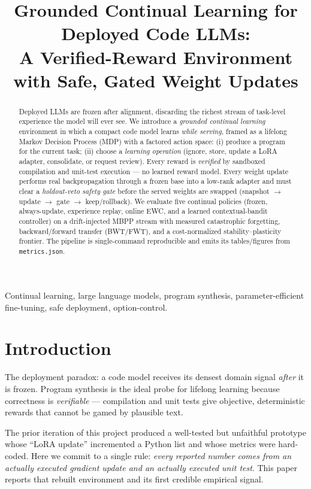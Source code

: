 \documentclass[10pt,conference]{IEEEtran}
\title{Grounded Continual Learning for Deployed Code LLMs:\\A Verified-Reward Environment with Safe, Gated Weight Updates}
\author{\IEEEauthorblockN{OpenContinualEnv Research}
\IEEEauthorblockA{Corresponding repository: \texttt{open\_continual\_env} (module \texttt{gcl})}
}
\begin{document}
\maketitle

\begin{abstract}
Deployed LLMs are frozen after alignment, discarding the richest stream of task-level experience the model will ever see. We introduce a \emph{grounded continual learning} environment in which a compact code model learns \emph{while serving}, framed as a lifelong Markov Decision Process (MDP) with a factored action space: (i) produce a program for the current task; (ii) choose a \emph{learning operation} (ignore, store, update a LoRA adapter, consolidate, or request review). Every reward is \emph{verified} by sandboxed compilation and unit-test execution --- no learned reward model. Every weight update performs real backpropagation through a frozen base into a low-rank adapter and must clear a \emph{holdout-veto safety gate} before the served weights are swapped (snapshot $\to$ update $\to$ gate $\to$ keep/rollback). We evaluate five continual policies (frozen, always-update, experience replay, online EWC, and a learned contextual-bandit controller) on a drift-injected MBPP stream with measured catastrophic forgetting, backward/forward transfer (BWT/FWT), and a cost-normalized stability--plasticity frontier. The pipeline is single-command reproducible and emits its tables/figures from \texttt{metrics.json}.
\end{abstract}

\begin{IEEEkeywords}
Continual learning, large language models, program synthesis, parameter-efficient fine-tuning, safe deployment, option-control.
\end{IEEEkeywords}

\section{Introduction}
The deployment paradox: a code model receives its densest domain signal \emph{after} it is frozen. Program synthesis is the ideal probe for lifelong learning because correctness is \emph{verifiable} --- compilation and unit tests give objective, deterministic rewards that cannot be gamed by plausible text.

The prior iteration of this project produced a well-tested but unfaithful prototype whose ``LoRA update'' incremented a Python list and whose metrics were hard-coded. Here we commit to a single rule: \emph{every reported number comes from an actually executed gradient update and an actually executed unit test}. This paper reports that rebuilt environment and its first credible empirical signal.
\end{document}
